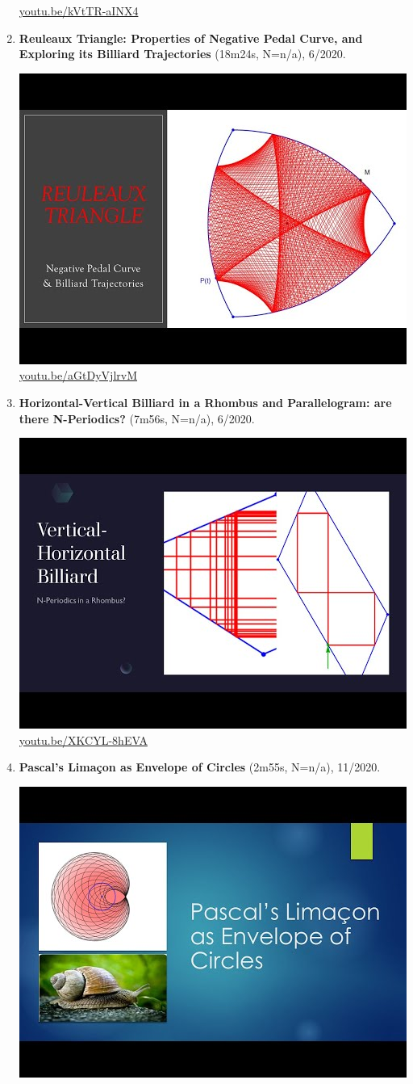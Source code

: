 \documentclass[12pt]{amsart}
\begin{document}
\begin{enumerate}[resume]
\begin{center}
\href{https://youtu.be/kVtTR-aINX4}{\url{youtu.be/kVtTR-aINX4}}\end{center}
% 
\item \textbf{Reuleaux Triangle: Properties of Negative Pedal Curve, and Exploring its Billiard Trajectories} (18m24s, N=n/a), 6/2020. 
\begin{center}\includegraphics[width=.5\textwidth]{pics/aGtDyVjlrvM.jpg} \\ 
\href{https://youtu.be/aGtDyVjlrvM}{\url{youtu.be/aGtDyVjlrvM}}\end{center}
% 
\item \textbf{Horizontal-Vertical Billiard in a Rhombus and Parallelogram: are there N-Periodics?} (7m56s, N=n/a), 6/2020. 
\begin{center}\includegraphics[width=.5\textwidth]{pics/XKCYL-8hEVA.jpg} \\ 
\href{https://youtu.be/XKCYL-8hEVA}{\url{youtu.be/XKCYL-8hEVA}}\end{center}
% 
\item \textbf{Pascal's Limaçon as Envelope of Circles} (2m55s, N=n/a), 11/2020. 
\begin{center}\includegraphics[width=.5\textwidth]{pics/495A_ZjgcyE.jpg} \\ 

\end{center}
\end{enumerate}
\end{document}
